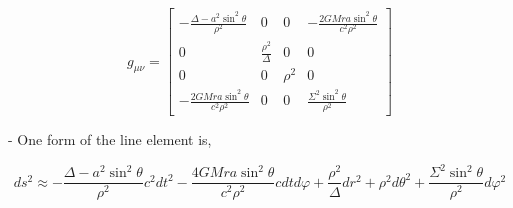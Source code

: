$$
    g_{\mu \nu}=\left[\begin{array}{cccc}
            -\frac{\Delta-a^2 \sin ^2 \theta}{\rho^2}    & 0                     & 0      & -\frac{2 G M r a \sin ^2 \theta}{c^2 \rho^2} \\
            0                                            & \frac{\rho^2}{\Delta} & 0      & 0                                            \\
            0                                            & 0                     & \rho^2 & 0                                            \\
            -\frac{2 G M r a \sin ^2 \theta}{c^2 \rho^2} & 0                     & 0      & \frac{\Sigma^2 \sin ^2 \theta}{\rho^2}
        \end{array}\right]
$$

- One form of the line element is,

$$
    d s^2 \approx-\frac{\Delta-a^2 \sin ^2 \theta}{\rho^2} c^2 d t^2-\frac{4 G M r a \sin ^2 \theta}{c^2 \rho^2} c d t d \varphi+\frac{\rho^2}{\Delta} d r^2+\rho^2 d \theta^2+\frac{\Sigma^2 \sin ^2 \theta}{\rho^2} d \varphi^2
$$

